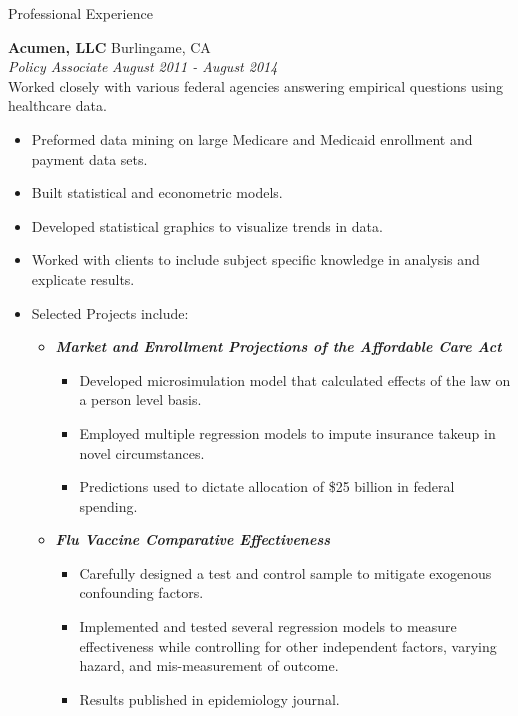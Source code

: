\documentclass{resume} %
\begin{document}
\begin{rSection}{Professional Experience}

\vspace{0.2em}

{\bf Acumen, LLC} \hfill Burlingame, CA \\
{\em Policy Associate} \hfill {\em August 2011 - August 2014} \vspace{0.3em} \\
Worked closely with various federal agencies answering empirical questions using healthcare data.
\vspace{-0.2em}
\begin{itemize} \itemsep -0.2em
	\item Preformed data mining on large Medicare and Medicaid enrollment and payment data sets.
    \item Built statistical and econometric models.
    \item Developed statistical graphics to visualize trends in data.
    \item Worked with clients to include subject specific knowledge in analysis and explicate results.
    \item Selected Projects include:
    \begin{itemize} \itemsep -0.2em
    	\item {\bf \em Market and Enrollment Projections of the Affordable Care 		Act}
        \begin{itemize} \itemsep -0.2em
    		\item Developed microsimulation model that calculated effects of the law on a person level basis. 	
            \item Employed multiple regression models to impute insurance takeup in novel circumstances. 
            \item Predictions used to dictate allocation of \$25 billion in federal spending.
    	\end{itemize}
    	\item {\bf \em Flu Vaccine Comparative Effectiveness}
        \begin{itemize} \itemsep -0.2em
    		\item Carefully designed a test and control sample to mitigate exogenous confounding factors.
            \item Implemented and tested several regression models to measure effectiveness while controlling for other independent factors, varying hazard, and mis-measurement of outcome.
            \item Results published in epidemiology journal. 
    	\end{itemize}


\end{itemize}
\end{itemize}
\end{rSection}
\end{document}
